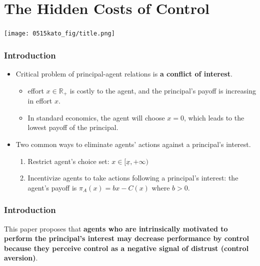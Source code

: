 \documentclass[unicode,12pt]{beamer}
\begin{document}
    \section{The Hidden Costs of Control}

    \begin{frame}
        \frametitle{}
    
        \centerline{\texttt{[image: 0515kato\_fig/title.png]}}
    
    \end{frame}

    \begin{frame}
        \frametitle{Introduction}
    
        \begin{itemize}
            \item Critical problem of principal-agent relations is \textbf{a conflict of interest}.
            \begin{itemize}
                \item effort $x \in \mathbb{R}_+$ is costly to the agent, and the principal's payoff is increasing in effort $x$.
                \item In standard economics, the agent will choose $x = 0$, which leads to the lowest payoff of the principal.
            \end{itemize}
            \item Two common ways to eliminate agents' actions against a principal's interest.
            \begin{enumerate}
                \item Restrict agent's choice set: $x \in [\underline{x}, +\infty)$
                \item Incentivize agents to take actions following a principal's interest: the agent's payoff is $\pi_A(x) = bx - C(x)$ where $b > 0$.
            \end{enumerate}
        \end{itemize}
    
    \end{frame}

    \begin{frame}
        \frametitle{Introduction}
    
        This paper proposes that \textbf{agents who are intrinsically motivated to perform the principal's interest may decrease performance by control because they perceive control as a negative signal of distrust (control aversion)}.
    
    \end{frame}
\end{document}
